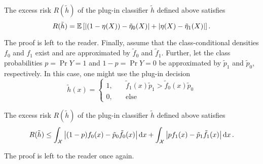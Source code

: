 \begin{theorem}
The excess risk $R(\tilde h)$ of the plug-in classifier $\tilde h$ defined above satisfies
\[
    R(\tilde h) = \mathbb{E}\left[\abs{(1 - \eta(X)) - \tilde{\eta}_0(X)} + \abs{\eta(X) - \tilde{\eta}_1(X)}\right].
\]
\end{theorem}

The proof is left to the reader. Finally, assume that the class-conditional densities $f_0$ and $f_1$ exist and are approximated by $\tilde f_0$ and $\tilde f_1$. Further, let the class probabilities $p = \Pr{Y=1}$ and $1-p = \Pr{Y=0}$ be approximated by $\tilde p_1$ and $\tilde p_0$, respectively. In this case, one might use the plug-in decision
\[
    \tilde h(x) = \begin{cases}
        1, \quad &\tilde f_1(x) \tilde p_1 > \tilde f_0(x) \tilde p_0 \\
        0, \quad &\text{else}
    \end{cases}
\]

\begin{proposition}
The excess risk $R(\tilde h)$ of the plug-in classifier $\tilde h$ defined above satisfies
\[
    R(\tilde h) \leq \int_{\mathcal{X}} \big\lvert (1-p) f_0(x) - \tilde p_0 \tilde f_0(x) \big\rvert \,\mathrm{d}x + \int_{\mathcal{X}} \big\lvert p f_1(x) - \tilde p_1 \tilde f_1(x) \big\rvert \,\mathrm{d}x \, .
\]
\end{proposition}

The proof is left to the reader once again.
